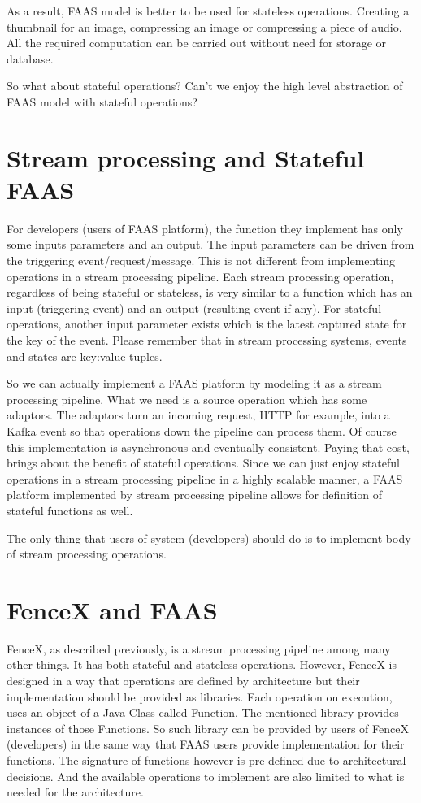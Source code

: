 \documentclass[a4]{report}
\begin{document}
    As a result, FAAS model is better to be used for stateless operations.
    Creating a thumbnail for an image, compressing an image or compressing a piece of audio.
    All the required computation can be carried out without need for storage or database.

    So what about stateful operations?
    Can't we enjoy the high level abstraction of FAAS model with stateful operations?


    \section{Stream processing and Stateful FAAS}
    For developers (users of FAAS platform), the function they implement has only some inputs parameters and an output.
    The input parameters can be driven from the triggering event/request/message.
    This is not different from implementing operations in a stream processing pipeline.
    Each stream processing operation, regardless of being stateful or stateless, is very similar to a function which
    has an input (triggering event) and an output (resulting event if any).
    For stateful operations, another input parameter exists which is the latest captured state for the key of the event.
    Please remember that in stream processing systems, events and states are key:value tuples.

    So we can actually implement a FAAS platform by modeling it as a stream processing pipeline.
    What we need is a source operation which has some adaptors.
    The adaptors turn an incoming request, HTTP for example, into a Kafka event so that operations down the pipeline
    can process them.
    Of course this implementation is asynchronous and eventually consistent.
    Paying that cost, brings about the benefit of stateful operations.
    Since we can just enjoy stateful operations in a stream processing pipeline in a highly scalable manner,
    a FAAS platform implemented by stream processing pipeline allows for definition of stateful functions as well.

    The only thing that users of system (developers) should do is to implement body of stream processing operations.


    \section{FenceX and FAAS}
    FenceX, as described previously, is a stream processing pipeline among many other things.
    It has both stateful and stateless operations.
    However, FenceX is designed in a way that operations are defined by architecture but their implementation should
    be provided as libraries.
    Each operation on execution, uses an object of a Java Class called Function.
    The mentioned library provides instances of those Functions.
    So such library can be provided by users of FenceX (developers) in the same way that FAAS users provide
    implementation for their functions.
    The signature of functions however is pre-defined due to architectural decisions.
    And the available operations to implement are also limited to what is needed for the architecture.
\end{document}

